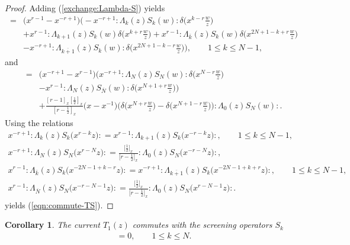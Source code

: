 \documentclass[pdftex]{sigma}
\numberwithin{equation}{section}
\newtheorem{Corollary}[Theorem]{Corollary}
\begin{document}
\begin{proof}
Adding (\ref{exchange:Lambda-S}) yields
\begin{align*}
[T_1(z),S_k(w)]={}&\big(x^{r-1}-x^{-r+1}\big)
\bigg({-}x^{-r+1}{:}\Lambda_k(z)S_k(w){:}\delta\bigg(x^{k-r}\frac{w}{z}\bigg)
\\
&+x^{r-1}{:}\Lambda_{k+1}(z)S_k(w){}\delta\bigg(x^{k+r}\frac{w}{z}\bigg)
+x^{r-1}{:}\Lambda_{\overline{k}}(z)S_k(w){}\delta\bigg(x^{2N+1-k+r}\frac{w}{z}\bigg)
\\
&-x^{-r+1}{:}\Lambda_{\overline{k+1}}(z)S_k(w){:}
\delta\bigg(x^{2N+1-k-r}\frac{w}{z}\bigg)\bigg),
\qquad
1\leq k \leq N-1,
\end{align*}
and
\begin{align*}
[T_1(z),S_N(w)]={}&\big(x^{-r+1}-x^{r-1}\big)
\bigg(x^{-r+1}{:}\Lambda_N(z)S_N(w){:}\delta\bigg(x^{N-r}\frac{w}{z}\bigg)
\\
&-x^{r-1}{:}\Lambda_N(z)S_{\overline{N}}(w){:}
\delta\bigg(x^{N+1+r}\frac{w}{z}\bigg)\bigg)
\\
&+\frac{[r-1]_x[\frac{1}{2}]_x}{[r-\frac{1}{2}]_x}\big(x-x^{-1}\big)
\bigg(\delta\bigg(x^{N+r}\frac{w}{z}\bigg)-\delta\bigg(x^{N+1-r}\frac{w}{z}
\bigg)\bigg){:}\Lambda_0(z)S_N(w){:}.
\end{align*}
Using the relations
\begin{gather*}
x^{-r+1}{:}\Lambda_k(z)S_k\big(x^{r-k}z\big){:}
=x^{r-1}{:}\Lambda_{k+1}(z)S_k\big(x^{-r-k}z\big){:},\qquad
1\leq k \leq N-1,
\\
x^{-r+1}{:}\Lambda_N(z)S_N\big(x^{r-N}z\big){:}
=\frac{\big[\frac{1}{2}\big]_x}{\big[r-\frac{1}{2}\big]_x}
{:}\Lambda_{0}(z)S_N\big(x^{-r-N}z\big){:},
\\
x^{r-1}{:}\Lambda_{\overline{k}}(z)S_k\big(x^{-2N{-}1+k-r}z\big){:}
=x^{-r+1}{:}\Lambda_{\overline{k+1}}(z)
S_k\big(x^{-2N{-}1+k+r}z\big){:},\qquad 1\leq k \leq N-1,
\\
x^{r-1}{:}\Lambda_{\overline{N}}(z)S_N\big(x^{-r-N-1}z\big){:}
=\frac{\big[\frac{1}{2}\big]_x}{\big[r-\frac{1}{2}\big]_x}
{:}\Lambda_{0}(z)S_N\big(x^{r-N-1}z\big){:}.
\end{gather*}
yields (\ref{eqn:commute-TS}).
\end{proof}


\begin{Corollary}
The current $T_1(z)$ commutes with the screening operators $S_k$
\begin{gather}
[T_1(z), S_k]=0,\qquad 1\leq k \leq N.
\label{eqn:screening2}
\end{gather}
\end{Corollary}
\end{document}
